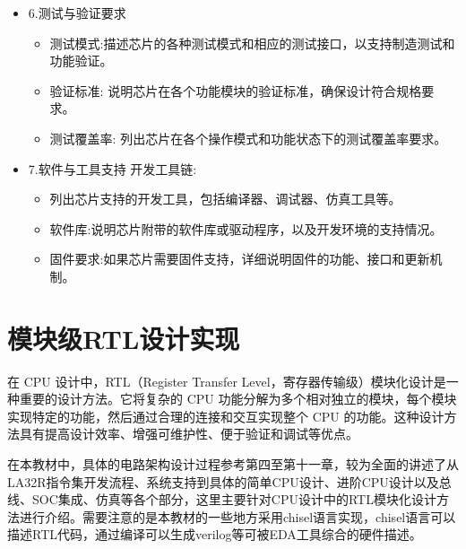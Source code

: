 \begin{itemize}
  \begin{itemize}
  \tightlist
  \item
    封装类型:说明芯片的封装类型和尺寸，以及与电路板的物理连接方式。
  \item
    电气参数:列出芯片的工作电压范围、电流消耗、功率消耗、输入/输出电压特性等。
  \item
    热管理: 提供热设计功耗（TDP）以及推荐的散热解决方案。
  \end{itemize}
\item
  6.测试与验证要求

  \begin{itemize}
  \tightlist
  \item
    测试模式:描述芯片的各种测试模式和相应的测试接口，以支持制造测试和功能验证。
  \item
    验证标准:
    说明芯片在各个功能模块的验证标准，确保设计符合规格要求。
  \item
    测试覆盖率: 列出芯片在各个操作模式和功能状态下的测试覆盖率要求。
  \end{itemize}
\item
  7.软件与工具支持 开发工具链:

  \begin{itemize}
  \tightlist
  \item
    列出芯片支持的开发工具，包括编译器、调试器、仿真工具等。
  \item
    软件库:说明芯片附带的软件库或驱动程序，以及开发环境的支持情况。
  \item
    固件要求:如果芯片需要固件支持，详细说明固件的功能、接口和更新机制。
  \end{itemize}
\end{itemize}

\section{模块级RTL设计实现}\label{sec:16-chip-frontend-011}

在 CPU 设计中，RTL（Register Transfer
Level，寄存器传输级）模块化设计是一种重要的设计方法。它将复杂的 CPU
功能分解为多个相对独立的模块，每个模块实现特定的功能，然后通过合理的连接和交互实现整个
CPU
的功能。这种设计方法具有提高设计效率、增强可维护性、便于验证和调试等优点。

在本教材中，具体的电路架构设计过程参考第四至第十一章，较为全面的讲述了从LA32R指令集开发流程、系统支持到具体的简单CPU设计、进阶CPU设计以及总线、SOC集成、仿真等各个部分，这里主要针对CPU设计中的RTL模块化设计方法进行介绍。需要注意的是本教材的一些地方采用chisel语言实现，chisel语言可以描述RTL代码，通过编译可以生成verilog等可被EDA工具综合的硬件描述。

